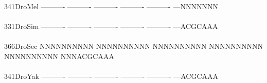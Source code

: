 \documentclass[11pt,twoside,reqno,a4paper]{article}
\begin{document}
{\\
341\hspace*{1\charwidth}DroMel	----------	----------	----------	----------	----------	---NNNNNNN	\\
\hspace*{4\charwidth}\hspace*{7\charwidth}\hspace*{1\charwidth}\hspace*{1\charwidth}\hspace*{1\charwidth}\hspace*{1\charwidth}\hspace*{1\charwidth}\hspace*{1\charwidth}\\
331\hspace*{1\charwidth}DroSim	----------	----------	----------	----------	----------	---ACGCAAA	\\
\hspace*{4\charwidth}\hspace*{7\charwidth}\hspace*{1\charwidth}\hspace*{1\charwidth}\hspace*{1\charwidth}\hspace*{1\charwidth}\hspace*{1\charwidth}\hspace*{1\charwidth}\\
366\hspace*{1\charwidth}DroSec	NNNNNNNNNN	NNNNNNNNNN	NNNNNNNNNN	NNNNNNNNNN	NNNNNNNNNN	NNNACGCAAA	\\
\hspace*{4\charwidth}\hspace*{7\charwidth}\hspace*{1\charwidth}\hspace*{1\charwidth}\hspace*{1\charwidth}\hspace*{1\charwidth}\hspace*{1\charwidth}\hspace*{1\charwidth}\\
341\hspace*{1\charwidth}DroYak	----------	----------	----------	----------	----------	---ACGCAAA	\\
\hspace*{4\charwidth}\hspace*{7\charwidth}\hspace*{1\charwidth}\hspace*{1\charwidth}\hspace*{1\charwidth}\hspace*{1\charwidth}\hspace*{1\charwidth}\hspace*{1\charwidth}\\
}
\end{document}
